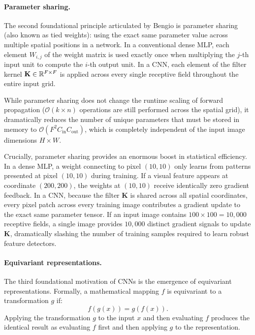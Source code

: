 \paragraph{Parameter sharing.}
The second foundational principle articulated by Bengio is parameter sharing (also known as tied weights): using the exact same parameter value across multiple spatial positions in a network. In a conventional dense MLP, each element $W_{i, j}$ of the weight matrix is used exactly once when multiplying the $j$-th input unit to compute the $i$-th output unit. In a CNN, each element of the filter kernel $\mathbf{K} \in \mathbb{R}^{F \times F}$ is applied across every single receptive field throughout the entire input grid.

While parameter sharing does not change the runtime scaling of forward propagation ($\mathcal{O}(k \times n)$ operations are still performed across the spatial grid), it dramatically reduces the number of unique parameters that must be stored in memory to $\mathcal{O}(F^2 C_{\text{in}} C_{\text{out}})$, which is completely independent of the input image dimensions $H \times W$. 

Crucially, parameter sharing provides an enormous boost in statistical efficiency. In a dense MLP, a weight connecting to pixel $(10, 10)$ only learns from patterns presented at pixel $(10, 10)$ during training. If a visual feature appears at coordinate $(200, 200)$, the weights at $(10, 10)$ receive identically zero gradient feedback. In a CNN, because the filter $\mathbf{K}$ is shared across all spatial coordinates, every pixel patch across every training image contributes a gradient update to the exact same parameter tensor. If an input image contains $100 \times 100 = 10,000$ receptive fields, a single image provides $10,000$ distinct gradient signals to update $\mathbf{K}$, dramatically slashing the number of training samples required to learn robust feature detectors.

\paragraph{Equivariant representations.}
The third foundational motivation of CNNs is the emergence of equivariant representations. Formally, a mathematical mapping $f$ is equivariant to a transformation $g$ if:
\begin{equation}
f(g(x)) = g(f(x)).
\label{eq:equivariance_general_definition}
\end{equation}
Applying the transformation $g$ to the input $x$ and then evaluating $f$ produces the identical result as evaluating $f$ first and then applying $g$ to the representation.

